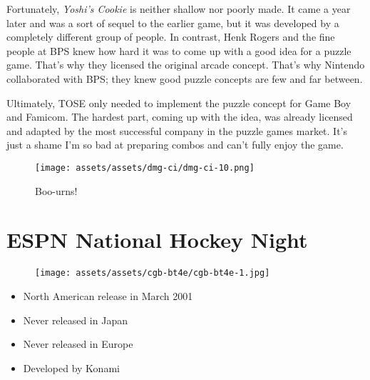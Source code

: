 \documentclass{book}
\begin{document}
Fortunately, \emph{Yoshi’s Cookie} is neither shallow nor poorly made. It came a year later and was a sort of sequel to the earlier game, but it was developed by a completely different group of people. In contrast, Henk Rogers and the fine people at BPS knew how hard it was to come up with a good idea for a puzzle game. That’s why they licensed the original arcade concept. That’s why Nintendo collaborated with BPS; they knew good puzzle concepts are few and far between.

Ultimately, TOSE only needed to implement the puzzle concept for Game Boy and Famicom. The hardest part, coming up with the idea, was already licensed and adapted by the most successful company in the puzzle games market. It’s just a shame I’m so bad at preparing combos and can’t fully enjoy the game.

\begin{figure}[hbt]
\vskip 10pt
\centering \texttt{[image: assets/assets/dmg-ci/dmg-ci-10.png]}\par\pagetwodescription Boo-urns!
\vskip 6pt
\end{figure}



\begingroup \chapter*{ESPN National Hockey Night} \endgroup
\begin{figure}[H]
\vskip 4pt
\centering
\texttt{[image: assets/assets/cgb-bt4e/cgb-bt4e-1.jpg]}\end{figure}
\begin{itemize} [nosep]




\item North American release in March 2001








\item Never released in Japan



\item Never released in Europe



\item Developed by Konami

\end{itemize}\noindent
\end{document}
